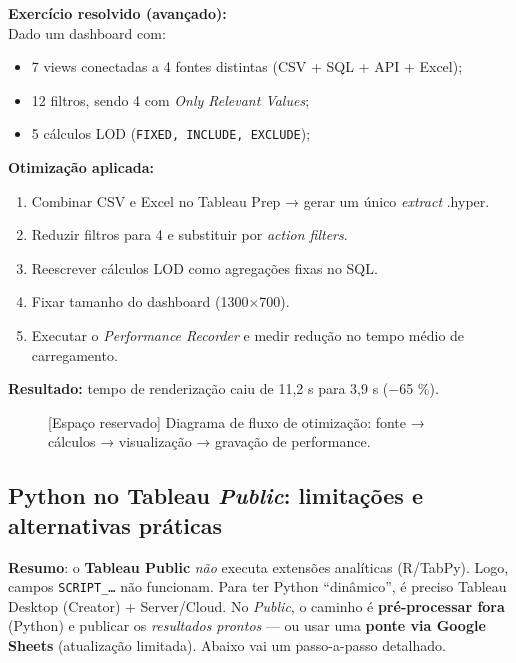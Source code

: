 \begin{SolvedBox}
\textbf{Exercício resolvido (avançado):}\\[-3pt]
Dado um dashboard com:
\begin{itemize}
  \item 7 views conectadas a 4 fontes distintas (CSV + SQL + API + Excel);
  \item 12 filtros, sendo 4 com \textit{Only Relevant Values};
  \item 5 cálculos LOD (\texttt{FIXED, INCLUDE, EXCLUDE});
\end{itemize}

\textbf{Otimização aplicada:}
\begin{enumerate}
  \item Combinar CSV e Excel no Tableau Prep → gerar um único \textit{extract} .hyper.  
  \item Reduzir filtros para 4 e substituir por \textit{action filters}.  
  \item Reescrever cálculos LOD como agregações fixas no SQL.  
  \item Fixar tamanho do dashboard (1300×700).  
  \item Executar o \textit{Performance Recorder} e medir redução no tempo médio de carregamento.  
\end{enumerate}

\textbf{Resultado:} tempo de renderização caiu de 11,2 s para 3,9 s (−65 \%).  
\end{SolvedBox}

\begin{figure}[H]
\centering
\fbox{\rule{0pt}{120pt}\rule{0.92\linewidth}{0pt}}
\caption{[Espaço reservado] Diagrama de fluxo de otimização: fonte → cálculos → visualização → gravação de performance.}
\end{figure}

\subsection{Python no Tableau \textit{Public}: limitações e alternativas práticas}
\textbf{Resumo}: o \textbf{Tableau Public} \emph{não} executa extensões analíticas (R/TabPy). Logo, campos \texttt{SCRIPT_…} não funcionam. Para ter Python “dinâmico”, é preciso Tableau Desktop (Creator) + Server/Cloud. No \textit{Public}, o caminho é \textbf{pré-processar fora} (Python) e publicar os \emph{resultados prontos} — ou usar uma \textbf{ponte via Google Sheets} (atualização limitada). Abaixo vai um passo-a-passo detalhado.

